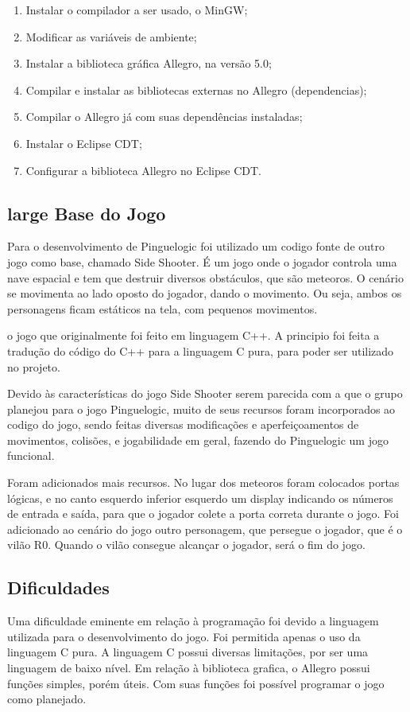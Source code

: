 \documentclass[fncyhd,a4paper]{article}
\begin{document}
	\begin{enumerate}
		\item Instalar o compilador a ser usado, o MinGW;
		\item Modificar as variáveis de ambiente;
		\item Instalar a biblioteca gráfica Allegro, na versão 5.0;
		\item Compilar e instalar as bibliotecas externas no Allegro (dependencias);
		\item Compilar o Allegro já com suas dependências instaladas;
		\item Instalar o Eclipse CDT;
		\item Configurar a biblioteca Allegro no Eclipse CDT.	
	\end{enumerate}
	
	\subsection{large Base do Jogo}
	\large Para o desenvolvimento de Pinguelogic foi utilizado um codigo fonte de outro jogo como base, chamado Side Shooter. É um jogo onde o jogador controla uma nave espacial e tem que 
	destruir diversos obstáculos, que são meteoros. O cenário se movimenta ao lado oposto do jogador, dando o movimento. Ou seja, ambos os personagens ficam estáticos na tela, com pequenos
	movimentos.
	
	\large o jogo que originalmente foi feito em linguagem C++. A principio foi feita a tradução do código do C++ para a linguagem C pura, para poder ser utilizado no projeto.
	
	\large Devido às características do jogo Side Shooter serem parecida com a que o grupo planejou para o jogo Pinguelogic, muito de seus recursos foram incorporados ao codigo do jogo, sendo
	feitas diversas modificações e aperfeiçoamentos de movimentos, colisões, e jogabilidade em geral, fazendo do Pinguelogic um jogo funcional.
	
	\large Foram adicionados mais recursos. No lugar dos meteoros foram colocados portas lógicas, e no canto esquerdo inferior esquerdo um display indicando os
	números de entrada e saída, para que o jogador colete a porta correta durante o jogo. Foi adicionado ao cenário do jogo outro personagem, que persegue o jogador, que é o vilão R0.
	Quando o vilão consegue alcançar o jogador, será o fim do jogo.
	
	\subsection{\large Dificuldades}
	\large Uma dificuldade eminente em relação à programação foi devido a linguagem utilizada para o desenvolvimento do jogo. Foi permitida apenas o uso da linguagem C pura. A linguagem
	C possui diversas limitações, por ser uma linguagem de baixo nível. Em relação à biblioteca grafica, o Allegro possui funções simples, porém úteis. Com suas funções foi possível
	programar o jogo como planejado.
	
\end{document}
